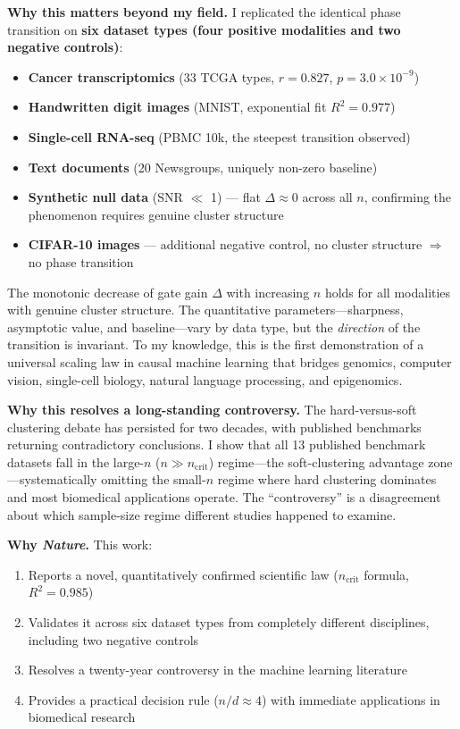 \documentclass[12pt,a4paper]{article}
\begin{document}
\noindent\textbf{Why this matters beyond my field.} I replicated the identical phase transition on \textbf{six dataset types (four positive modalities and two negative controls)}:
\begin{itemize}
    \item \textbf{Cancer transcriptomics} (33 TCGA types, $r = 0.827$, $p = 3.0 \times 10^{-9}$)
    \item \textbf{Handwritten digit images} (MNIST, exponential fit $R^2 = 0.977$)
    \item \textbf{Single-cell RNA-seq} (PBMC 10k, the steepest transition observed)
    \item \textbf{Text documents} (20 Newsgroups, uniquely non-zero baseline)
    \item \textbf{Synthetic null data} (SNR $\ll$ 1) --- flat $\Delta \approx 0$ across all $n$, confirming the phenomenon requires genuine cluster structure
    \item \textbf{CIFAR-10 images} --- additional negative control, no cluster structure $\Rightarrow$ no phase transition
\end{itemize}
The monotonic decrease of gate gain $\Delta$ with increasing $n$ holds for all modalities with genuine cluster structure. The quantitative parameters---sharpness, asymptotic value, and baseline---vary by data type, but the \emph{direction} of the transition is invariant. To my knowledge, this is the first demonstration of a universal scaling law in causal machine learning that bridges genomics, computer vision, single-cell biology, natural language processing, and epigenomics.

\noindent\textbf{Why this resolves a long-standing controversy.} The hard-versus-soft clustering debate has persisted for two decades, with published benchmarks returning contradictory conclusions. I show that all 13 published benchmark datasets fall in the large-$n$ ($n \gg n_{\text{crit}}$) regime---the soft-clustering advantage zone---systematically omitting the small-$n$ regime where hard clustering dominates and most biomedical applications operate. The ``controversy'' is a disagreement about which sample-size regime different studies happened to examine.

\noindent\textbf{Why \textit{Nature}.} This work:
\begin{enumerate}
    \item Reports a novel, quantitatively confirmed scientific law ($n_{\text{crit}}$ formula, $R^2 = 0.985$)
    \item Validates it across six dataset types from completely different disciplines, including two negative controls
    \item Resolves a twenty-year controversy in the machine learning literature
    \item Provides a practical decision rule ($n/d \approx 4$) with immediate applications in biomedical research
\end{enumerate}
\end{document}
